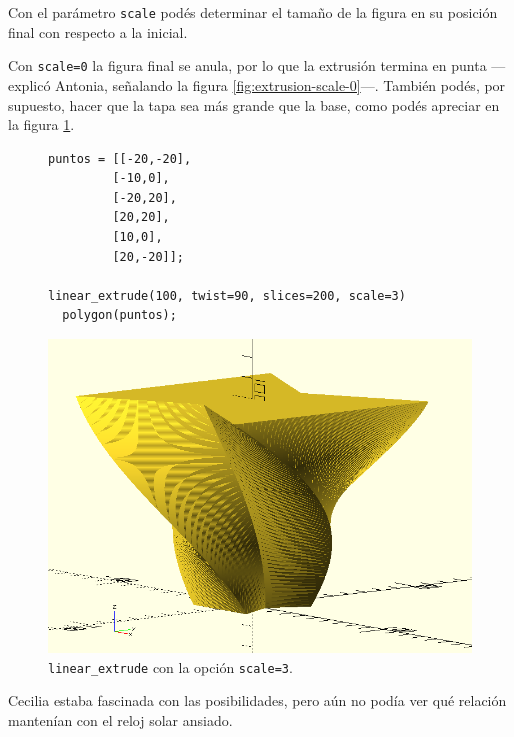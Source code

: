   \guillemotright Con el parámetro \texttt{scale} podés determinar el
  tamaño de la figura en su posición final con respecto a la inicial.


  \guillemotright Con \texttt{scale=0} la figura final se anula, por
  lo que la extrusión termina en punta ---explicó Antonia, señalando
  la figura \ref{fig:extrusion-scale-0}---.  También podés, por
  supuesto, hacer que la tapa sea más grande que la base, como podés
  apreciar en la figura \ref{fig:extrusion-scale-3}.


      \begin{figure}[h!]
  \begin{minipage}[]{.6\textwidth}%
    \begin{lstlisting}
puntos = [[-20,-20],
         [-10,0],
         [-20,20],
         [20,20],
         [10,0],
         [20,-20]];

linear_extrude(100, twist=90, slices=200, scale=3)
  polygon(puntos);
    \end{lstlisting}
  \end{minipage}\hfill
  \begin{minipage}[]{.4\textwidth}%
      \flushright
      \includegraphics[width=1\textwidth]{imagenes/extrusion-scale-3}
    \end{minipage}
    \caption{\lstinline!linear_extrude! con la opción \texttt{scale=3}.}
    \label{fig:extrusion-scale-3}
  \end{figure}

  Cecilia estaba fascinada con las posibilidades, pero aún no podía
  ver qué relación mantenían con el reloj solar ansiado.

